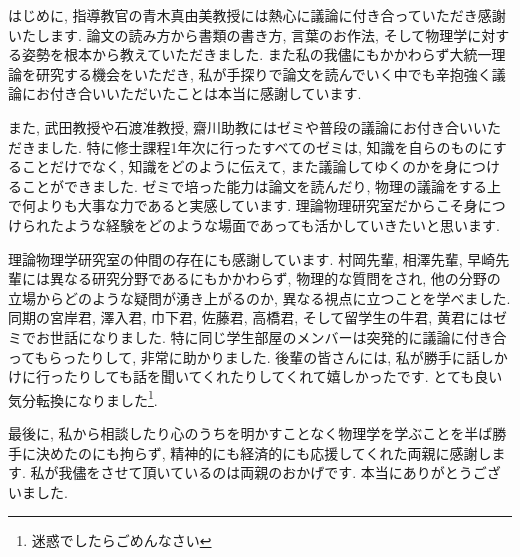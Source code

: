 はじめに, 指導教官の青木真由美教授には熱心に議論に付き合っていただき感謝いたします.
論文の読み方から書類の書き方, 言葉のお作法, そして物理学に対する姿勢を根本から教えていただきました.
また私の我儘にもかかわらず大統一理論を研究する機会をいただき, 私が手探りで論文を読んでいく中でも辛抱強く議論にお付き合いいただいたことは本当に感謝しています.

また, 武田教授や石渡准教授, 齋川助教にはゼミや普段の議論にお付き合いいただきました.
特に修士課程1年次に行ったすべてのゼミは, 知識を自らのものにすることだけでなく, 知識をどのように伝えて, また議論してゆくのかを身につけることができました.
ゼミで培った能力は論文を読んだり, 物理の議論をする上で何よりも大事な力であると実感しています.
理論物理研究室だからこそ身につけられたような経験をどのような場面であっても活かしていきたいと思います.

理論物理学研究室の仲間の存在にも感謝しています.
村岡先輩, 相澤先輩, 早崎先輩には異なる研究分野であるにもかかわらず, 物理的な質問をされ, 他の分野の立場からどのような疑問が湧き上がるのか, 異なる視点に立つことを学べました.
同期の宮岸君, 澤入君, 巾下君, 佐藤君, 高橋君, そして留学生の牛君, 黄君にはゼミでお世話になりました.
特に同じ学生部屋のメンバーは突発的に議論に付き合ってもらったりして, 非常に助かりました.
後輩の皆さんには, 私が勝手に話しかけに行ったりしても話を聞いてくれたりしてくれて嬉しかったです.
とても良い気分転換になりました\footnote{迷惑でしたらごめんなさい}.

最後に, 私から相談したり心のうちを明かすことなく物理学を学ぶことを半ば勝手に決めたのにも拘らず, 精神的にも経済的にも応援してくれた両親に感謝します.
私が我儘をさせて頂いているのは両親のおかげです.
本当にありがとうございました.
